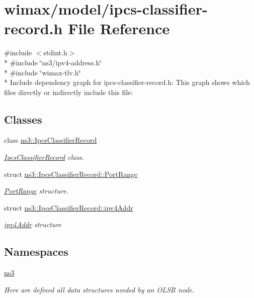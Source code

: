 \hypertarget{ipcs-classifier-record_8h}{}\section{wimax/model/ipcs-\/classifier-\/record.h File Reference}
\label{ipcs-classifier-record_8h}
{\ttfamily \#include $<$stdint.\+h$>$}\\*
{\ttfamily \#include \char`\"{}ns3/ipv4-\/address.\+h\char`\"{}}\\*
{\ttfamily \#include \char`\"{}wimax-\/tlv.\+h\char`\"{}}\\*
Include dependency graph for ipcs-\/classifier-\/record.h\+:
This graph shows which files directly or indirectly include this file\+:
\subsection*{Classes}
\begin{DoxyCompactItemize}
\item 
class \hyperlink{classns3_1_1IpcsClassifierRecord}{ns3\+::\+Ipcs\+Classifier\+Record}
\begin{DoxyCompactList}\small\item\em \hyperlink{classns3_1_1IpcsClassifierRecord}{Ipcs\+Classifier\+Record} class. \end{DoxyCompactList}\item 
struct \hyperlink{structns3_1_1IpcsClassifierRecord_1_1PortRange}{ns3\+::\+Ipcs\+Classifier\+Record\+::\+Port\+Range}
\begin{DoxyCompactList}\small\item\em \hyperlink{structns3_1_1IpcsClassifierRecord_1_1PortRange}{Port\+Range} structure. \end{DoxyCompactList}\item 
struct \hyperlink{structns3_1_1IpcsClassifierRecord_1_1ipv4Addr}{ns3\+::\+Ipcs\+Classifier\+Record\+::ipv4\+Addr}
\begin{DoxyCompactList}\small\item\em \hyperlink{structns3_1_1IpcsClassifierRecord_1_1ipv4Addr}{ipv4\+Addr} structure \end{DoxyCompactList}\end{DoxyCompactItemize}
\subsection*{Namespaces}
\begin{DoxyCompactItemize}
\item 
 \hyperlink{namespacens3}{ns3}
\begin{DoxyCompactList}\small\item\em Here are defined all data structures needed by an O\+L\+SR node. \end{DoxyCompactList}\end{DoxyCompactItemize}
